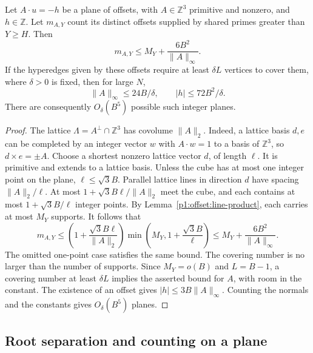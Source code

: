 \begin{lemma}
\label{p1:offset:normal-budget}
Let $A\cdot u=-h$ be a plane of offsets, with $A\in\mathbb Z^3$
primitive and nonzero, and $h\in\mathbb Z$. Let $m_{A,Y}$ count its
distinct offsets supplied by shared primes greater than $Y\ge H$.
Then
\begin{equation}
 m_{A,Y}\le M_Y+\frac{6B^2}{\|A\|_\infty}.
 \label{p1:offset:normal-count}
\end{equation}
If the hyperedges given by these offsets require at least $\delta L$
vertices to cover them, where $\delta>0$ is fixed, then for large $N$,
\[
 \|A\|_\infty\le24B/\delta,
 \qquad |h|\le72B^2/\delta.
\]
There are consequently $O_\delta(B^5)$ possible such integer planes.
\end{lemma}
\begin{proof}
The lattice $\Lambda=A^\perp\cap\mathbb Z^3$ has covolume
$\|A\|_2$. Indeed, a lattice basis $d,e$ can be completed by an
integer vector $w$ with $A\cdot w=1$ to a basis of $\mathbb Z^3$,
so $d\times e=\pm A$.
Choose a shortest nonzero lattice vector $d$, of length $\ell$.
It is primitive and extends to a lattice basis. Unless the cube has
at most one integer point on the plane, $\ell\le\sqrt3B$.
Parallel lattice lines in direction $d$ have spacing $\|A\|_2/\ell$.
At most $1+\sqrt3B\ell/\|A\|_2$ meet the cube, and each contains
at most $1+\sqrt3B/\ell$ integer points. By
Lemma~\ref{p1:offset:line-product}, each carries at most $M_Y$ supports.
It follows that
\[
 m_{A,Y}\le
 \left(1+\frac{\sqrt3B\ell}{\|A\|_2}\right)
       \min\left(M_Y,1+\frac{\sqrt3B}{\ell}\right)
 \le M_Y+\frac{6B^2}{\|A\|_\infty}.
\]
The omitted one-point case satisfies the same bound.
The covering number is no larger than the number of supports.
Since $M_Y=o(B)$ and $L=B-1$, a covering number at least $\delta L$
implies the asserted bound for $A$, with room in the constant.
The existence of an offset gives $|h|\le3B\|A\|_\infty$.
Counting the normals and the constants gives $O_\delta(B^5)$ planes.
\end{proof}

\subsection{Root separation and counting on a plane}

